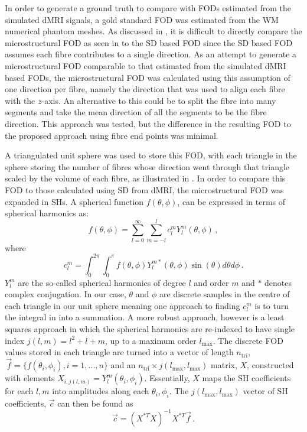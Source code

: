 In order to generate a ground truth to compare with \acp{FOD} estimated from the simulated \ac{dMRI} signals, a gold standard \ac{FOD} was estimated from the \ac{WM} numerical phantom meshes.
As discussed in , it is difficult to directly compare the microstructural \ac{FOD} as seen in  to the \ac{SD} based \ac{FOD} since the \ac{SD} based \ac{FOD} assumes each fibre contributes to a single direction.
As an attempt to generate a microstructural \ac{FOD} comparable to that estimated from the simulated \ac{dMRI} based \acp{FOD}, the microstructural \ac{FOD} was calculated using this assumption of one direction per fibre, namely the direction that was used to align each fibre with the $z$-axis.
An alternative to this could be to split the fibre into many segments and take the mean direction of all the segments to be the fibre direction. This approach was tested, but the difference in the resulting \ac{FOD} to the proposed approach using fibre end points was minimal.

A triangulated unit sphere was used to store this \ac{FOD}, with each triangle in the sphere storing the number of fibres whose direction went through that triangle scaled by the volume of each fibre, as illustrated in .
In order to compare this \ac{FOD} to those calculated using \ac{SD} from \ac{dMRI}, the microstructural \ac{FOD} was expanded in \aclp{SH}. A spherical function $f(\theta, \phi)$, can be expressed in terms of spherical harmonics as:
\begin{equation}
  f(\theta, \phi) = \sum_{l=0}^{\infty} \sum_{m=-l}^{l} c_l^m Y_l^m(\theta, \phi)\,,
  \label{eq:frf_SH_expansion}
\end{equation}
where
\begin{equation}
  c_l^m = \int_0^{2\pi} \int_0^\pi f(\theta, \phi) Y_l^{m*}(\theta, \phi) \sin(\theta) d\theta d\phi\,.
  \label{eq:frf_SH_coeff}
\end{equation}
$Y_l^m$ are the so-called spherical harmonics of degree $l$ and order $m$ and $*$ denotes complex conjugation.
In our case, $\theta$ and $\phi$ are discrete samples in the centre of each triangle in our unit sphere meaning one approach to finding $c_l^m$ is to turn the integral in  into a summation. A more robust approach, however is a least squares approach \cite{Alexander2002,Brechbuhler1995} in which the spherical harmonics are re-indexed to have single index $j(l,m) = l^2 + l + m$, up to a maximum order $l_{\mathrm{max}}$.
The discrete \ac{FOD} values stored in each triangle are turned into a vector of length $n_{\mathrm{tri}}$, $\,\vec{f} = \{f(\theta_i, \phi_i), i=1,...,n\}$ and an $n_{\mathrm{tri}} \times j(l_{\mathrm{max}}, l_{\mathrm{max}})$ matrix, $X$, constructed with elements $X_{i, j(l,m)} = Y_l^m(\theta_i, \phi_i)$. Essentially, $X$ maps the SH coefficients for each $l,m$ into amplitudes along each $\theta_i, \phi_i$.
The $j(l_{\mathrm{max}}, l_{\mathrm{max}})$ vector of SH coefficients, $\vec{c}$ can then be found as
\begin{equation}
\vec{c} = (X^{*T}X)^{-1}X^{*T} \vec{f}\,.
\end{equation}

